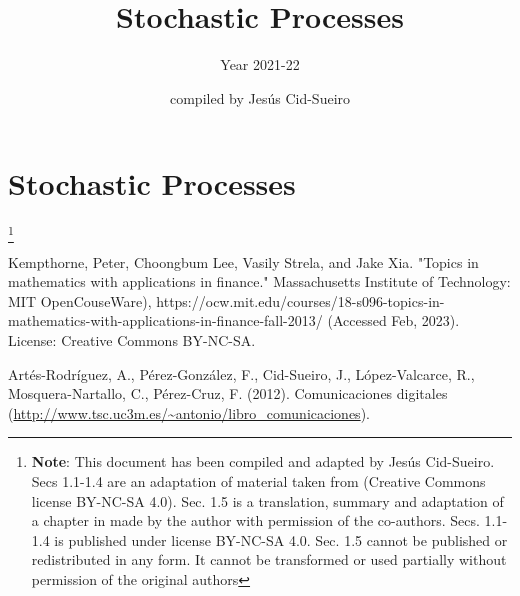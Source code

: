 \documentclass[graybox,sectrefs]{svmono_mod}
\begin{document}
\author{compiled by Jes\'us Cid-Sueiro}
\title{Stochastic Processes}
\subtitle{Year 2021-22}

\chapter{Stochastic Processes}
\footnote{\textbf{Note}: This document has been compiled and adapted by Jesús Cid-Sueiro. Secs 1.1-1.4 are an adaptation of material taken from \cite{MITcourse} (Creative Commons license BY-NC-SA 4.0). Sec. 1.5 is a translation, summary and adaptation of a chapter in \cite{ComDig2007} made by the author with permission of the co-authors. Secs. 1.1-1.4 is published under license BY-NC-SA 4.0. Sec. 1.5 cannot be published or redistributed in any form. It cannot be transformed or used partially without permission of the original authors}
\vspace{11cm}

\mainmatter 
\tableofcontents



\begin{thebibliography}{99.}

Kempthorne, Peter, Choongbum Lee, Vasily Strela, and Jake Xia. "Topics in mathematics with applications in finance." Massachusetts Institute of Technology: MIT OpenCouseWare), https://ocw.mit.edu/courses/18-s096-topics-in-mathematics-with-applications-in-finance-fall-2013/ (Accessed Feb, 2023). License: Creative Commons BY-NC-SA.

Artés-Rodríguez, A., Pérez-González, F., Cid-Sueiro, J., López-Valcarce, R., Mosquera-Nartallo, C., Pérez-Cruz, F. (2012). Comunicaciones digitales (\url{http://www.tsc.uc3m.es/~antonio/libro_comunicaciones}).

\end{thebibliography}
\end{document}

